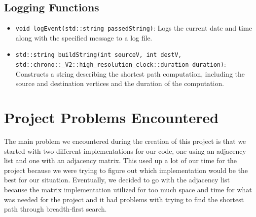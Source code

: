 \documentclass{article}
\begin{document}
\subsection{Logging Functions}
\begin{itemize}
    \item \texttt{void logEvent(std::string passedString)}: Logs the current date and time along with the specified message to a log file.
    \item \texttt{std::string buildString(int sourceV, int destV, std::chrono::\_V2::high\_resolution\_clock::duration duration)}: Constructs a string describing the shortest path computation, including the source and destination vertices and the duration of the computation.
\end{itemize}

\section{Project Problems Encountered}
The main problem we encountered during the creation of this project is that we started with two different implementations for our code, one using an adjacency list and one with an adjacency matrix. This used up a lot of our time for the project because we were trying to figure out which implementation would be the best for our situation. Eventually, we decided to go with the adjacency list because the matrix implementation utilized for too much space and time for what was needed for the project and it had problems with trying to find the shortest path through breadth-first search.
\end{document}
